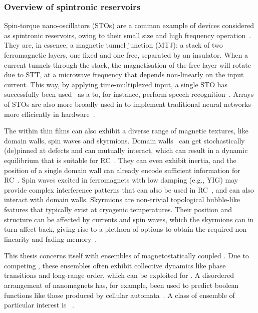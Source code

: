 \subsubsection{Overview of spintronic reservoirs}
Spin-torque nano-oscillators (STOs) are a common example of devices considered as spintronic reservoirs, owing to their small size and high frequency operation~\cite{tsunegi2019STOforcedsyncRC}.
They are, in essence, a magnetic tunnel junction (MTJ): a stack of two ferromagnetic layers, one fixed and one free, separated by an insulator.
When a current tunnels through the stack, the magnetisation of the free layer will rotate due to STT, at a microwave frequency that depends non-linearly on the input current.
This way, by applying time-multiplexed input, a single STO has successfully been used~\cite{tsunegi2019STOforcedsyncRC} as a  to, for instance, perform speech recognition~\cite{STO_RC_Riou2021,NeuromorphicOscillators}.
Arrays of STOs are also more broadly used in  to implement traditional neural networks more efficiently in hardware~\cite{VowelRecognition4STO}. \par
The  within  thin films can also exhibit a diverse range of magnetic textures, like domain walls, spin waves and skyrmions.
Domain walls~\cite{Venkat_2024} can get stochastically (de)pinned at defects and can mutually interact, which can result in a dynamic equilibrium that is suitable for RC~\cite{DynamicEmergence_NanomagneticSystem}.
They can even exhibit inertia, and the position of a single domain wall can already encode sufficient information for RC~\cite{RC_DW}.
Spin waves excited in ferromagnets with low damping (e.g., YIG) may provide complex interference patterns that can also be used in RC~\cite{RC_SpinWaveInterference}, and can also interact with domain walls.
Skyrmions are non-trivial topological bubble-like features that typically exist at cryogenic temperatures.
Their position and structure can be affected by currents and spin waves, which the skyrmions can in turn affect back, giving rise to a plethora of options to obtain the required non-linearity and fading memory~\cite{RC_TaskAgnosticMetrics_v2,RC_SkyrmionCrystalSW}. \par
This thesis concerns itself with ensembles of magnetostatically coupled .
Due to competing , these ensembles often exhibit collective dynamics like phase transitions and long-range order, which can be exploited for .
A disordered arrangement of nanomagnets has, for example, been used to predict boolean functions like those produced by cellular automata~\cite{RC_PassiveFrustratedNM,RC_DipoleNanomagnets}. %
A class of ensemble of particular interest is ~\cite{RC_ASI}.

